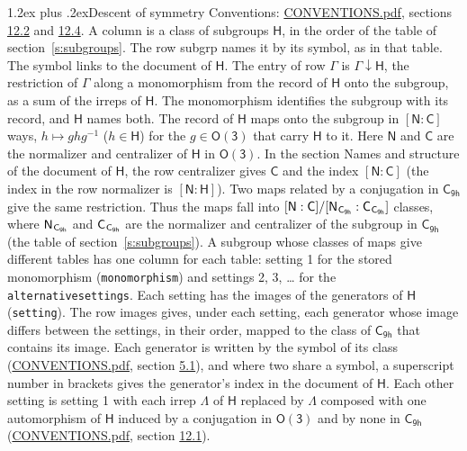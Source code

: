 \documentclass[10pt,a4paper]{article}
\makeatletter
\renewcommand\section{\@startsection{section}{1}{\z@}{-3ex plus -1ex minus -.2ex}%
  {1.2ex plus .2ex}{\normalfont\large\sffamily\bfseries\color{parttitle}}}
\numberwithin{equation}{section}
\newcommand{\grp}[1]{\mathsf{#1}}
\newcommand{\grpindex}[2]{[#1 : #2]}
\newcommand{\restr}[2]{#1\!\downarrow#2}
\newcommand{\hairsp}{\mkern1mu}
\makeatother
\begin{document}
\section{Descent of symmetry}\label{s:subduction}
Conventions: \href{../../CONVENTIONS.pdf}{CONVENTIONS.pdf}, sections \href{../../CONVENTIONS.pdf\#conv.12.2}{12.2} and \href{../../CONVENTIONS.pdf\#conv.12.4}{12.4}.
A column is a class of subgroups $\grp{H}$, in the order of the table of section~\ref{s:subgroups}. The row subgrp names it by its symbol, as in that table. The symbol links to the document of $\grp{H}$. The entry of row $\Gamma$ is $\restr{\Gamma}{\grp{H}}$, the restriction of $\Gamma$ along a monomorphism from the record of $\grp{H}$ onto the subgroup, as a sum of the irreps of $\grp{H}$. The monomorphism identifies the subgroup with its record, and $\grp{H}$ names both. \label{n:group.normalizer.o3}\label{n:group.centralizer.o3}The record of $\grp{H}$ maps onto the subgroup in $\grpindex{\grp{N}}{\grp{C}}$ ways, $h \mapsto g h g^{-1}$ ($h \in \grp{H}$) for the $g \in \grp{O(3)}$ that carry $\grp{H}$ to it. Here $\grp{N}$ and $\grp{C}$ are the normalizer and centralizer of $\grp{H}$ in \href{O3.pdf}{$\grp{O(3)}$}. In the section Names and structure of the document of $\grp{H}$, the row centralizer gives $\grp{C}$ and the index $\grpindex{\grp{N}}{\grp{C}}$ (the index in the row normalizer is $\grpindex{\grp{N}}{\grp{H}}$). Two maps related by a conjugation in $\grp{C_{9h}}$ give the same restriction. Thus the maps fall into $\grpindex{\grp{N}}{\grp{C}}/\grpindex{\grp{N}_{\hairsp \grp{C_{9h}}}}{\grp{C}_{\hairsp \grp{C_{9h}}}}$ classes, where $\grp{N}_{\hairsp \grp{C_{9h}}}$ and $\grp{C}_{\hairsp \grp{C_{9h}}}$ are the normalizer and centralizer of the subgroup in $\grp{C_{9h}}$ (the table of section~\ref{s:subgroups}). \label{n:head.setting}A subgroup whose classes of maps give different tables has one column for each table: setting 1 for the stored monomorphism (\texttt{monomorphism}) and settings 2, 3, \dots{} for the \texttt{alternativesettings}. Each setting has the images of the generators of $\grp{H}$ (\texttt{setting}). \label{n:head.images}The row images gives, under each setting, each generator whose image differs between the settings, in their order, mapped to the class of $\grp{C_{9h}}$ that contains its image. Each generator is written by the symbol of its class (\href{../../CONVENTIONS.pdf}{CONVENTIONS.pdf}, section \href{../../CONVENTIONS.pdf\#conv.5.1}{5.1}), and where two share a symbol, a superscript number in brackets gives the generator's index in the document of $\grp{H}$. \label{n:irrep.Delta}Each other setting is setting 1 with each irrep $\Lambda$ of $\grp{H}$ replaced by $\Lambda$ composed with one automorphism of $\grp{H}$ induced by a conjugation in \href{O3.pdf}{$\grp{O(3)}$} and by none in $\grp{C_{9h}}$ (\href{../../CONVENTIONS.pdf}{CONVENTIONS.pdf}, section \href{../../CONVENTIONS.pdf\#conv.12.1}{12.1}).
\end{document}

